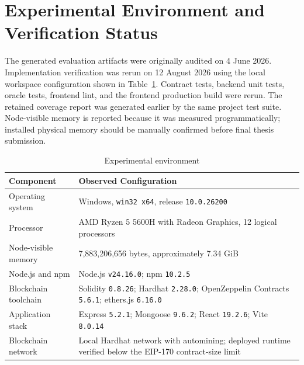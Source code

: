 \section{Experimental Environment and Verification Status}
\label{sec:experimental_environment}

The generated evaluation artifacts were originally audited on 4 June 2026.
Implementation verification was rerun on 12 August 2026 using the local
workspace configuration shown in Table~\ref{tab:environment}. Contract tests,
backend unit tests, oracle tests, frontend lint, and the frontend production
build were rerun. The retained
coverage report was generated earlier by the same project test suite.
Node-visible memory is reported because it was measured programmatically;
installed physical memory should be manually confirmed before final thesis
submission.

\begin{table}[htbp]
\centering
\caption{Experimental environment}
\label{tab:environment}
\begin{tabular}{|p{5.0cm}|p{8.4cm}|}
\hline
\textbf{Component} & \textbf{Observed Configuration} \\
\hline
Operating system & Windows, \texttt{win32 x64}, release \texttt{10.0.26200} \\
\hline
Processor & AMD Ryzen 5 5600H with Radeon Graphics, 12 logical processors \\
\hline
Node-visible memory & 7,883,206,656 bytes, approximately 7.34 GiB \\
\hline
Node.js and npm & Node.js \texttt{v24.16.0}; npm \texttt{10.2.5} \\
\hline
Blockchain toolchain & Solidity \texttt{0.8.26}; Hardhat \texttt{2.28.0};
OpenZeppelin Contracts \texttt{5.6.1}; ethers.js \texttt{6.16.0} \\
\hline
Application stack & Express \texttt{5.2.1}; Mongoose \texttt{9.6.2}; React
\texttt{19.2.6}; Vite \texttt{8.0.14} \\
\hline
Blockchain network & Local Hardhat network with automining; deployed runtime
verified below the EIP-170 contract-size limit \\
\hline
\end{tabular}
\end{table}


